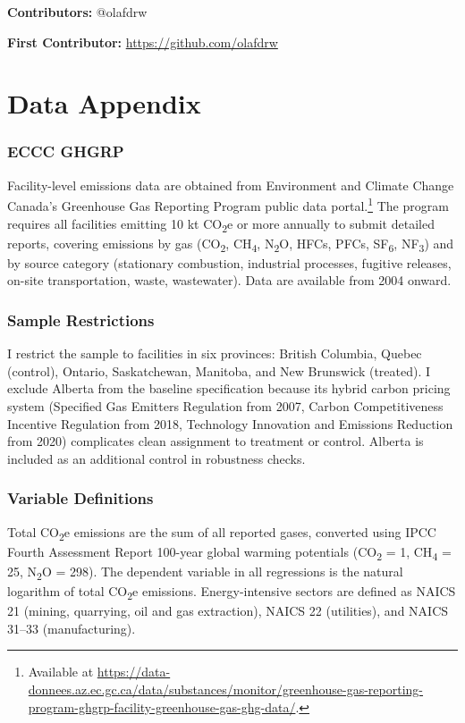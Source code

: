 \documentclass[12pt]{article}
\begin{document}
\noindent\textbf{Contributors:} @olafdrw

\noindent\textbf{First Contributor:} \url{https://github.com/olafdrw}

\label{apep_main_text_end}
\newpage


\newpage
\appendix

\section{Data Appendix}
\label{app:data}

\subsubsection*{ECCC GHGRP} Facility-level emissions data are obtained from Environment and Climate Change Canada's Greenhouse Gas Reporting Program public data portal.\footnote{Available at \url{https://data-donnees.az.ec.gc.ca/data/substances/monitor/greenhouse-gas-reporting-program-ghgrp-facility-greenhouse-gas-ghg-data/}.} The program requires all facilities emitting 10 kt CO\textsubscript{2}e or more annually to submit detailed reports, covering emissions by gas (CO\textsubscript{2}, CH\textsubscript{4}, N\textsubscript{2}O, HFCs, PFCs, SF\textsubscript{6}, NF\textsubscript{3}) and by source category (stationary combustion, industrial processes, fugitive releases, on-site transportation, waste, wastewater). Data are available from 2004 onward.

\subsubsection*{Sample Restrictions} I restrict the sample to facilities in six provinces: British Columbia, Quebec (control), Ontario, Saskatchewan, Manitoba, and New Brunswick (treated). I exclude Alberta from the baseline specification because its hybrid carbon pricing system (Specified Gas Emitters Regulation from 2007, Carbon Competitiveness Incentive Regulation from 2018, Technology Innovation and Emissions Reduction from 2020) complicates clean assignment to treatment or control. Alberta is included as an additional control in robustness checks.

\subsubsection*{Variable Definitions} Total CO\textsubscript{2}e emissions are the sum of all reported gases, converted using IPCC Fourth Assessment Report 100-year global warming potentials (CO\textsubscript{2} = 1, CH\textsubscript{4} = 25, N\textsubscript{2}O = 298). The dependent variable in all regressions is the natural logarithm of total CO\textsubscript{2}e emissions. Energy-intensive sectors are defined as NAICS 21 (mining, quarrying, oil and gas extraction), NAICS 22 (utilities), and NAICS 31--33 (manufacturing).
\end{document}
